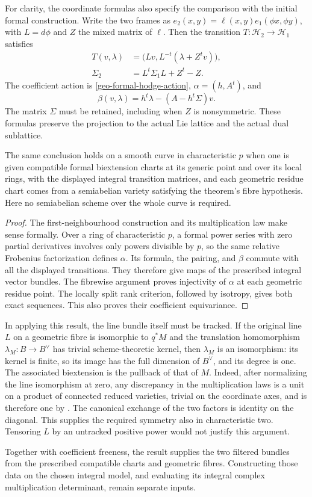 For clarity, the coordinate formulas also specify the comparison
with the initial formal construction. Write the two frames as
$e_2(x,y)=\ell(x,y)e_1(\phi x,\phi y)$, with
$L=d\phi$ and $Z$ the mixed matrix of $\ell$. Then the transition
$T:\mathcal H_2\to\mathcal H_1$ satisfies
\begin{align*}
        T(v,\lambda)&=\bigl(Lv,L^{-t}(\lambda+Z^tv)\bigr),\\
        \Sigma_2&=L^t\Sigma_1L+Z^t-Z.
\end{align*}
The coefficient action is \eqref{geo-formal-hodge-action},
$\alpha=(h,A^t)$, and
\[
                  \beta(v,\lambda)
                        =h^t\lambda-(A-h^t\Sigma)v.
\]
The matrix $\Sigma$ must be retained, including when $Z$ is
nonsymmetric.
These formulas preserve the projection to the actual Lie lattice
and the actual dual sublattice.

\begin{corollary}
\label{geo-biextension-formal-curve}
The same conclusion holds on a smooth curve in characteristic $p$
when one is given
compatible formal biextension charts at its generic point and
over its local rings, with the displayed integral transition
matrices, and each geometric residue chart comes from a
semiabelian variety satisfying the theorem's fibre hypothesis.
Here no semiabelian scheme over the whole curve is required.
\end{corollary}
\begin{proof}
The first-neighbourhood construction and its multiplication law
make sense formally. Over a ring of characteristic $p$, a formal
power series with zero partial derivatives involves only powers
divisible by $p$, so the same relative Frobenius factorization
defines $\alpha$. Its formula, the pairing, and $\beta$ commute
with all the displayed transitions. They therefore give maps of
the prescribed integral vector bundles. The fibrewise argument
proves injectivity of $\alpha$ at each geometric residue point.
The locally split rank criterion, followed by isotropy, gives both
exact sequences. This also proves their coefficient equivariance.
\end{proof}

In applying this result, the line bundle itself must be tracked.
If the original line $L$ on a geometric fibre is isomorphic to
$q^*M$ and the translation homomorphism
$\lambda_M:B\to B^\vee$ has trivial scheme-theoretic kernel, then
$\lambda_M$ is an isomorphism: its kernel is finite, so its image
has the full dimension of $B^\vee$, and its degree is one.
The associated biextension is the pullback of that of $M$.
Indeed, after normalizing the line isomorphism at zero, any
discrepancy in the multiplication laws is a unit on a product
of connected reduced varieties, trivial on the coordinate axes,
and is therefore one by \cite[Theorem~1.1]{conrad-units-product}.
The canonical exchange of the two factors is identity on the
diagonal. This supplies the required symmetry also in
characteristic two. Tensoring $L$ by an untracked positive power
would not justify this argument.

Together with coefficient freeness, the result supplies the two
filtered bundles from the prescribed compatible charts and
geometric fibres. Constructing those data on the chosen integral
model, and evaluating its integral complex multiplication
determinant, remain separate inputs.
